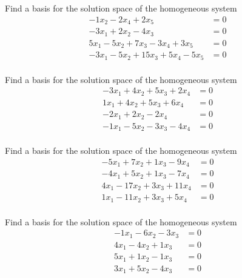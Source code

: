 \documentclass{article}
\begin{document}
\begin{exerciseStatement}
    Find a basis for the solution space of the homogeneous system
\begin{align*}
 -1 x_ 2 -2 x_ 4 + 2 x_ 5 &= 0  \\
  -3 x_ 1 + 2 x_ 2 -4 x_ 3 &= 0  \\
  5 x_ 1 -5 x_ 2 + 7 x_ 3 -3 x_ 4 + 3 x_ 5 &= 0  \\
  -3 x_ 1 -5 x_ 2 + 15 x_ 3 + 5 x_ 4 -5 x_ 5 &= 0  \\
 \end{align*}



  
\end{exerciseStatement}

\begin{exerciseStatement}
    Find a basis for the solution space of the homogeneous system
\begin{align*}
 -3 x_ 1 + 4 x_ 2 + 5 x_ 3 + 2 x_ 4 &= 0  \\
  1 x_ 1 + 4 x_ 2 + 5 x_ 3 + 6 x_ 4 &= 0  \\
  -2 x_ 1 + 2 x_ 2 -2 x_ 4 &= 0  \\
  -1 x_ 1 -5 x_ 2 -3 x_ 3 -4 x_ 4 &= 0  \\
 \end{align*}



  
\end{exerciseStatement}

\begin{exerciseStatement}
    Find a basis for the solution space of the homogeneous system
\begin{align*}
 -5 x_ 1 + 7 x_ 2 + 1 x_ 3 -9 x_ 4 &= 0  \\
  -4 x_ 1 + 5 x_ 2 + 1 x_ 3 -7 x_ 4 &= 0  \\
  4 x_ 1 -17 x_ 2 + 3 x_ 3 + 11 x_ 4 &= 0  \\
  1 x_ 1 -11 x_ 2 + 3 x_ 3 + 5 x_ 4 &= 0  \\
 \end{align*}



  
\end{exerciseStatement}

\begin{exerciseStatement}
    Find a basis for the solution space of the homogeneous system
\begin{align*}
 -1 x_ 1 -6 x_ 2 -3 x_ 3 &= 0  \\
  4 x_ 1 -4 x_ 2 + 1 x_ 3 &= 0  \\
  5 x_ 1 + 1 x_ 2 -1 x_ 3 &= 0  \\
  3 x_ 1 + 5 x_ 2 -4 x_ 3 &= 0  \\
 \end{align*}



  
\end{exerciseStatement}
\end{document}
